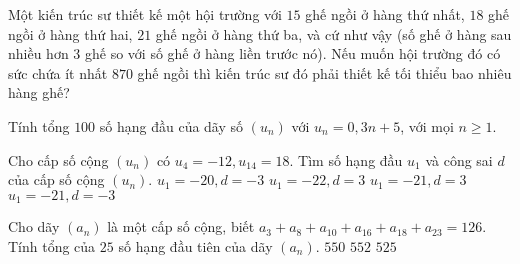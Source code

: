 \begin{ex}%
    Một kiến trúc sư thiết kế một hội trường với $15$ ghế ngồi ở hàng thứ nhất, $18$ ghế ngồi ở hàng thứ hai, $21$ ghế ngồi ở hàng thứ ba, và cứ như vậy (số ghế ở hàng sau nhiều hơn 3 ghế so với số ghế ở hàng liền trước nó). Nếu muốn hội trường đó có sức chứa ít nhất $870$ ghế ngồi thì kiến trúc sư đó phải thiết kế tối thiểu bao nhiêu hàng ghế?
\end{ex}

\begin{ex}
    Tính tổng $100$ số hạng đầu của dãy số $(u_n)$ với $u_n=0{,}3n+5$, với mọi $n \geq 1$.  
\end{ex}

\begin{ex}
    Cho cấp số cộng $\left(u_n\right)$ có $u_4=-12, u_{14}=18$. Tìm số hạng đầu $u_1$ và công sai $d$ của cấp số cộng $\left(u_n\right)$. 
    \choice 
    {$u_1=-20,d=-3$}
    {$u_1=-22,d=3$ }
    {\True $u_1=-21,d=3$}
    {$u_1=-21,d=-3$}
\end{ex}

\begin{ex}
    Cho dãy $(a_n)$ là một cấp số cộng, biết $a_3+a_8+a_{10}+a_{16}+a_{18}+a_{23}=126$. Tính tổng của $25$ số hạng đầu tiên của dãy $(a_n)$. 
    {$ 550$}
    {$ 552$}
    {\True $525 $}
\end{ex}

